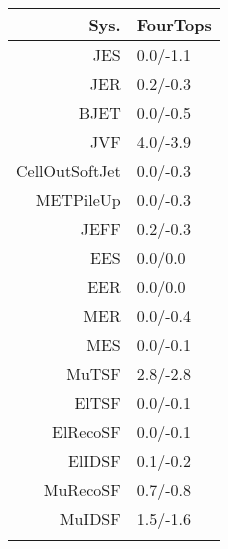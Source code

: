 \begin{tabular}{r|p{.08\linewidth}}
\toprule
 Sys.  & FourTops \\
\toprule
JES  & 0.0/-1.1 \\
JER  & 0.2/-0.3 \\
BJET  & 0.0/-0.5 \\
JVF  & 4.0/-3.9 \\
CellOutSoftJet  & 0.0/-0.3 \\
METPileUp  & 0.0/-0.3 \\
JEFF  & 0.2/-0.3 \\
EES  & 0.0/0.0 \\
EER  & 0.0/0.0 \\
MER  & 0.0/-0.4 \\
MES  & 0.0/-0.1 \\
MuTSF  & 2.8/-2.8 \\
ElTSF  & 0.0/-0.1 \\
ElRecoSF  & 0.0/-0.1 \\
ElIDSF  & 0.1/-0.2 \\
MuRecoSF  & 0.7/-0.8 \\
MuIDSF  & 1.5/-1.6 \\
 \\
\bottomrule
\end{tabular}

